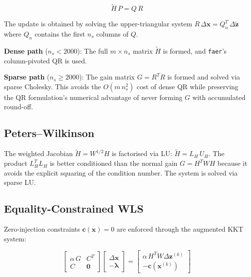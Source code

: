 \documentclass[11pt,a4paper]{article}
\begin{document}
\begin{equation}
  \tilde{H}\,P = Q\,R
\end{equation}

The update is obtained by solving the upper-triangular system
$R\,\Delta\mathbf{x} = Q_n^T\,\Delta\tilde{\mathbf{z}}$ where $Q_n$
contains the first $n_s$ columns of $Q$.

\textbf{Dense path} ($n_s < 2000$): The full $m \times n_s$ matrix
$\tilde{H}$ is formed, and \texttt{faer}'s column-pivoted QR is used.

\textbf{Sparse path} ($n_s \ge 2000$): The gain matrix $G = R^TR$ is
formed and solved via sparse Cholesky.  This avoids the $O(m\,n_s^2)$
cost of dense QR while preserving the QR formulation's numerical
advantage of never forming $G$ with accumulated round-off.

\subsection{Peters--Wilkinson}\label{sec:pw}

The weighted Jacobian $\tilde{H} = W^{1/2}H$ is factorised via LU:
$\tilde{H} = L_H\,U_H$.  The product $L_H^T L_H$ is better conditioned
than the normal gain $G = H^TWH$ because it avoids the explicit squaring
of the condition number.  The system is solved via sparse LU.

\subsection{Equality-Constrained WLS}\label{sec:ec}

Zero-injection constraints $\mathbf{c}(\mathbf{x}) = 0$ are enforced
through the augmented \gls{KKT} system:

\begin{equation}\label{eq:kkt}
  \begin{bmatrix}
    \alpha\,G   & C^T \\
    C           & \mathbf{0}
  \end{bmatrix}
  \begin{bmatrix}
    \Delta\mathbf{x} \\ -\bm{\lambda}
  \end{bmatrix}
  =
  \begin{bmatrix}
    \alpha\,H^T W \Delta\mathbf{z}^{(k)} \\
    -\mathbf{c}(\mathbf{x}^{(k)})
  \end{bmatrix}
\end{equation}
\end{document}
